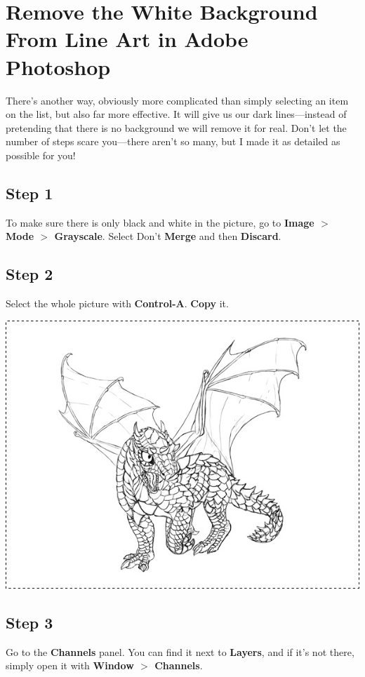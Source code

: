
\section{Remove the White Background From Line Art in Adobe Photoshop}
There's another way, obviously more complicated than simply selecting an item on the list, but also far more effective. It will give us our dark lines—instead of pretending that there is no background we will remove it for real. Don't let the number of steps scare you—there aren't so many, but I made it as detailed as possible for you!

\subsection{Step 1}
To make sure there is only black and white in the picture, go to \textbf{Image $ > $ Mode $ > $ Grayscale}. Select Don't \textbf{Merge} and then \textbf{Discard}.

\subsection{Step 2}
Select the whole picture with \textbf{Control-A}. \textbf{Copy} it.

\begin{center}
\includegraphics[width=0.7\linewidth]{Photos/quick-lineart-select-all}
\end{center}

\subsection{Step 3}
Go to the\textbf{ Channels} panel. You can find it next to \textbf{Layers}, and if it's not there, simply open it with \textbf{Window $ > $ Channels}.

